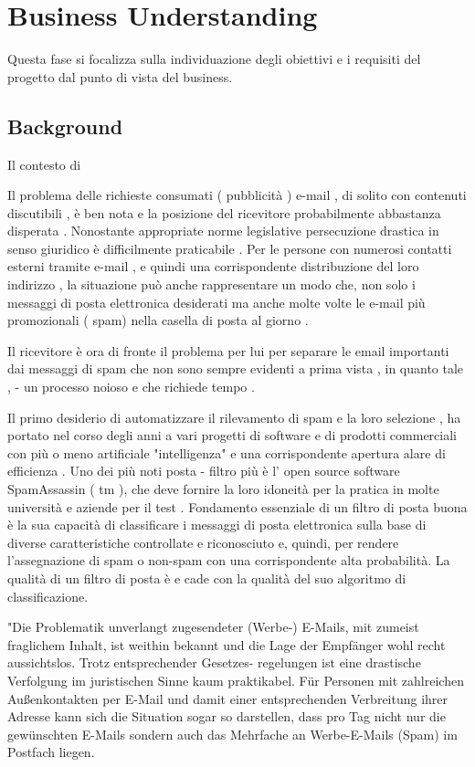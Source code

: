 \section{Business Understanding}
Questa fase si focalizza sulla individuazione degli obiettivi e i requisiti del progetto dal punto di vista del business.

\subsection{Background}
Il contesto di 

Il problema delle richieste consumati ( pubblicità ) e-mail , di solito con contenuti discutibili , è ben nota e la posizione del ricevitore probabilmente abbastanza disperata . Nonostante appropriate norme legislative persecuzione drastica in senso giuridico è difficilmente praticabile .
Per le persone con numerosi contatti esterni tramite e-mail , e quindi una corrispondente distribuzione del loro indirizzo , la situazione può anche rappresentare un modo che, non solo i messaggi di posta elettronica desiderati ma anche molte volte le e-mail più promozionali ( spam) nella casella di posta al giorno .

Il ricevitore è ora di fronte il problema per lui per separare le email importanti dai messaggi di spam che non sono sempre evidenti a prima vista , in quanto tale , - un processo noioso e che richiede tempo .

Il primo desiderio di automatizzare il rilevamento di spam e la loro selezione , ha portato nel corso degli anni a vari progetti di software e di prodotti commerciali con più o meno artificiale "intelligenza" e una corrispondente apertura alare di efficienza . Uno dei più noti posta - filtro più è l' open source software SpamAssassin ( tm ), che deve fornire la loro idoneità per la pratica in molte università e aziende per il test .
Fondamento essenziale di un filtro di posta buona è la sua capacità di classificare i messaggi di posta elettronica sulla base di diverse caratteristiche controllate e riconosciuto e, quindi, per rendere l'assegnazione di spam o non-spam con una corrispondente alta probabilità. La qualità di un filtro di posta è e cade con la qualità del suo algoritmo di classificazione.

"Die Problematik unverlangt zugesendeter (Werbe-) E-Mails, mit zumeist fraglichem Inhalt, ist weithin bekannt und die Lage der Empfänger wohl recht aussichtslos. Trotz entsprechender Gesetzes- regelungen ist eine drastische Verfolgung im juristischen Sinne kaum praktikabel. 
Für Personen mit zahlreichen Außenkontakten per E-Mail und damit einer entsprechenden Verbreitung ihrer Adresse kann sich die Situation sogar so darstellen, dass pro Tag nicht nur die gewünschten E-Mails sondern auch das Mehrfache an Werbe-E-Mails (Spam) im Postfach liegen.

